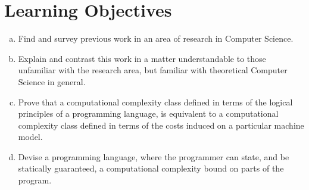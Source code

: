 
\section{Learning Objectives}

\begin{enumerate}[(a)]

\item Find and survey previous work in an area of research in Computer Science.

\item Explain and contrast this work in a matter understandable to those
unfamiliar with the research area, but familiar with theoretical Computer
Science in general.

\item Prove that a computational complexity class defined in terms of the
logical principles of a programming language, is equivalent to a computational
complexity class defined in terms of the costs induced on a particular machine
model.

\item Devise a programming language, where the programmer can state, and be
statically guaranteed, a computational complexity bound on parts of the
program.

\end{enumerate}
